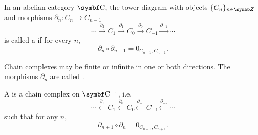 \begin{definition}\label{def:chain_complex}\cite{nLab:chain_complex}
  In an abelian category \( \Cat{C} \), the tower diagram with objects \( \{ C_n \}_{n \in \BZ} \) and morphisms \( \partial_n: C_n \to C_{n-1} \)
  \begin{equation}\label{def:chain_complex/chain_diagram}
    \cdots
    \overset {\partial_2} \longrightarrow
    C_1
    \overset {\partial_1} \longrightarrow
    C_0
    \overset {\partial_0} \longrightarrow
    C_{-1}
    \overset {\partial_{-1}} \longrightarrow
    \cdots
  \end{equation}
  is called a  if for every \( n \),
  \begin{equation*}
    \partial_n \circ \partial_{n+1} = 0_{C_{n+1},C_{n-1}}.
  \end{equation*}

  Chain complexes may be finite or infinite in one or both directions. The morphisms \( \partial_n \) are called .

  A  is a chain complex on \( \Cat{C}^{-1} \), i.e.
  \begin{equation}\label{def:chain_complex/cochain_diagram}
    \cdots
    \overset {\partial_1} \longleftarrow
    C_1
    \overset {\partial_0} \longleftarrow
    C_0
    \overset {\partial_{-1}} \longleftarrow
    C_{-1}
    \overset {\partial_{-2}} \longleftarrow
    \cdots
  \end{equation}
  such that for any \( n \),
  \begin{equation*}
    \partial_{n+1} \circ \partial_n = 0_{C_{n-1},C_{n+1}}.
  \end{equation*}
\end{definition}
